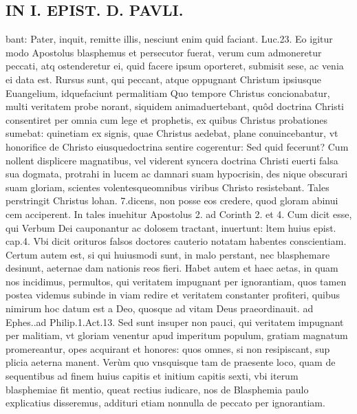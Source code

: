 \documentclass{article}
\begin{document}
\begin{pages}
\section*{IN I. EPIST. D. PAVLI. }
\marginpar{[ p.35 ]}\pstart   bant: Pater, inquit, remitte illis, nesciunt enim quid faciant. Luc.23. Eo igitur modo Apostolus blasphemus et persecutor fuerat, verum cum admoneretur peccati, atq ostenderetur ei, quid facere ipsum oporteret, submisit sese, ac venia ei data est. Rursus sunt, qui peccant, atque  oppugnant Christum ipsiusque  Euangelium, idquefaciunt permalitiam Quo tempore Christus concionabatur, multi veritatem probe norant, siquidem animaduertebant, quôd doctrina Christi consentiret per omnia cum lege et prophetis, ex quibus Christus probationes sumebat: quinetiam ex signis, quae Christus aedebat, plane conuincebantur, vt honorifice de Christo eiusquedoctrina sentire cogerentur: Sed quid fecerunt? Cum nollent displicere magnatibus, vel viderent syncera doctrina Christi euerti falsa sua dogmata, protrahi in lucem ac damnari suam hypocrisin, des nique  obscurari suam gloriam, scientes volentesqueomnibus viribus Christo resistebant. Tales perstringit Christus lohan. 7.dicens, non posse eos credere, quod gloram abinui cem acciperent. In tales inuehitur Apostolus 2. ad Corinth 2. et 4. Cum dicit esse, qui Verbum Dei cauponantur ac dolosem tractant, inuertunt: ltem huius epist. cap.4. Vbi dicit orituros falsos doctores cauterio notatam habentes conscientiam. Certum autem est, si qui huiusmodi sunt, in malo perstant, nec blasphemare desinunt, aeternae dam nationis reos fieri. Habet autem et haec aetas, in quam nos incidimus, permultos, qui veritatem impugnant per ignorantiam, quos tamen postea videmus subinde in viam redire et veritatem constanter profiteri, quibus nimirum hoc datum est a Deo, quosque  ad vitam Deus praeordinauit. ad Ephes..ad Philip.1.Act.13. Sed sunt insuper non pauci, qui veritatem impugnant per malitiam, vt gloriam venentur apud imperitum populum, gratiam magnatum promereantur, opes acquirant et honores: quos omnes, si non resipiscant, sup plicia aeterna manent. Verùm quo vnsquisque  tam de praesente loco, quam de sequentibus ad finem huius capitis et initium capitis sexti, vbi iterum blasphemiae fit mentio, queat rectius iudicare, nos de Blasphemia paulo explicatius disseremus, addituri etiam nonnulla de peccato per ignorantiam.  \pend
{}
{}

\end{pages}
\end{document}
